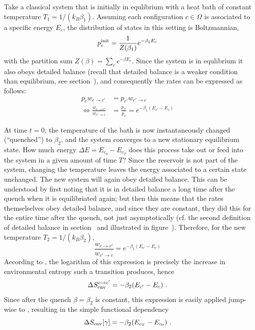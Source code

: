 Take a classical system that is initially in equlibrium with a heat bath of constant temperature \(T_1 = 1/(k_B\beta_1)\). Assuming each configuration \(c\in\Omega\) is associated to a specific energy \(E_c\), the distribution of states in this setting is Boltzmannian,
%
\begin{equation}
	p_c^{\text{init}} = \frac1{Z(\beta_1)}e^{-\beta_1E_c}
\end{equation}
%
with the partition sum \(Z(\beta) = \sum_ce^{-\beta E_c}\). Since the system is in equlibrium it also obeys detailed balance (recall that detailed balance is a weaker condition than equilibrium, see section~), and consequently the rates can be expressed as follows:
%
\begin{align}
	p_c w_{c\to c'} &= p_{c'} w_{c'\to c}
	\\
	\Leftrightarrow
		   \frac{w_{c\to c'}}{w_{c'\to c}}
		&= \frac{p_{c'}}{p_c}
		 = e^{-\beta_1(E_{c'}-E_c)}
\end{align}

At time \(t = 0\), the temperature of the bath is now instantaneously changed (``quenched'') to \(\beta_2\), and the system converges to a new stationary equilibrium state. How much energy \(\Delta E = E_{c_0} - E_{c_T}\) does this process take out or feed into the system in a given amount of time \(T\)?
Since the reservoir is not part of the system, changing the temperature leaves the energy associated to a certain state unchanged. The new system will again obey detailed balance. This can be understood by first noting that it is in detailed balance a long time after the quench when it is equilibriated again; but then this means that the rates themselselves obey detailed balance, and since they are constant, they did this for the entire time after the quench, not just asymptotically (cf. the second definition of detailed balance in section~ and illustrated in figure~). Therefore, for the new temperature \(T_2 = 1/(k_B\beta_2)\),
%
\begin{equation}
	\frac{w_{c\to c'}}{w_{c'\to c}}
	= e^{-\beta_2(E_{c'}-E_c)}
\end{equation}
%
According to , the logarithm of this expression is precisely the increase in environmental entropy such a transition produces, hence
%
\begin{equation}
	\Delta S_\text{env}^{c\to c'} = -\beta_2(E_{c'}-E_c) ~.
\end{equation}
%
Since after the quench \(\beta = \beta_2\) is constant, this expression is easily applied jump-wise to , resulting in the simple functional dependency
%
\begin{equation}
	\label{eqn:Delta SEnv in terms of energies}
	\Delta S_\text{env}[\gamma] = -\beta_2(E_{c_T}-E_{c_0}) ~.
\end{equation}

